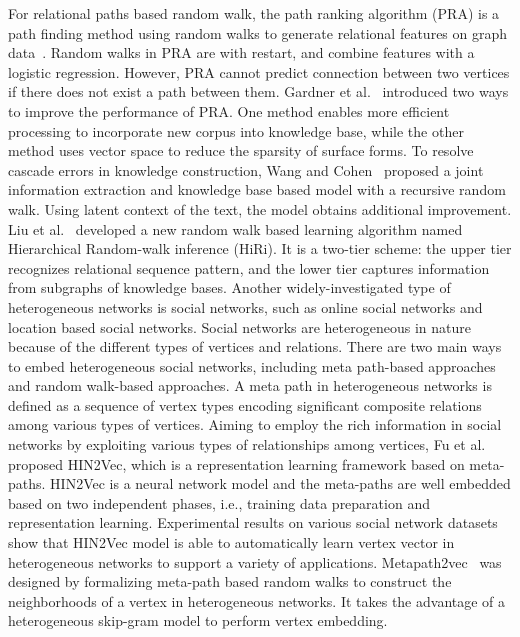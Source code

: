 For relational paths based random walk, the path ranking algorithm (PRA) is a path finding method using random walks to generate relational features on graph data~. Random walks in PRA are with restart, and combine features with a logistic regression. However, PRA cannot predict connection between two vertices if there does not exist a path between them. Gardner et al.~ introduced two ways to improve the performance of PRA. One method enables more efficient processing to incorporate new corpus into knowledge base, while the other method uses vector space to reduce the sparsity of surface forms. To resolve cascade errors in knowledge construction, Wang and Cohen~ proposed a joint information extraction and knowledge base based model with a recursive random walk. Using latent context of the text, the model obtains additional improvement. Liu et al.~ developed a new random walk based learning algorithm named Hierarchical Random-walk inference (HiRi). It is a two-tier scheme: the upper tier recognizes relational sequence pattern, and the lower tier captures information from subgraphs of knowledge bases.
Another widely-investigated type of heterogeneous networks is social networks, such as online social networks and location based social networks. Social networks are heterogeneous in nature because of the different types of vertices and relations. There are two main ways to embed heterogeneous social networks, including meta path-based approaches and random walk-based approaches.
A meta path in heterogeneous networks is defined as a sequence of vertex types encoding significant composite relations among various types of vertices. Aiming to employ the rich information in social networks by exploiting various types of relationships among vertices, Fu et al.~ proposed HIN2Vec, which is a representation learning framework based on meta-paths. HIN2Vec is a neural network model and the meta-paths are well embedded based on two independent phases, i.e., training data preparation and representation learning. Experimental results on various social network datasets show that HIN2Vec model is able to automatically learn vertex vector in heterogeneous networks to support a variety of applications. Metapath2vec~ was designed by formalizing meta-path based random walks to construct the neighborhoods of a vertex in heterogeneous networks. It takes the advantage of a heterogeneous skip-gram model to perform vertex embedding.
